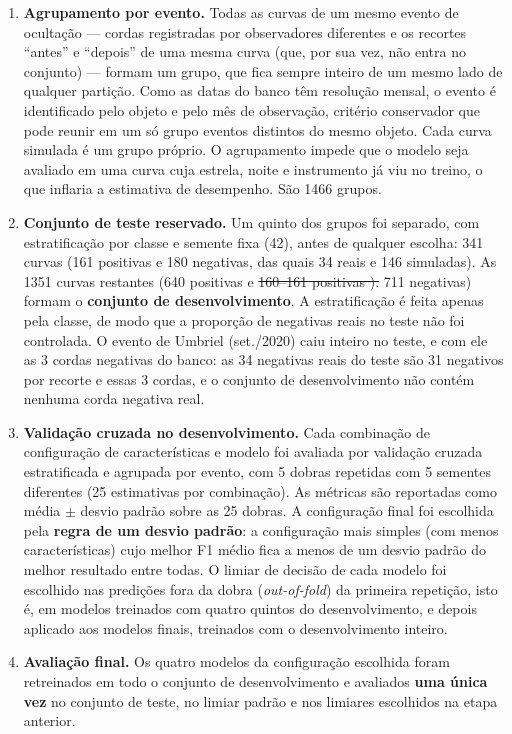 \documentclass[msc]{on} %
\makeatletter
\providecommand{\DIFaddtex}[1]{{\protect\color{red}#1}} %
\providecommand{\DIFdeltex}[1]{{\protect\color{red}\sout{#1}}} %
\providecommand{\DIFaddbegin}{} %
\providecommand{\DIFaddend}{} %
\providecommand{\DIFdelbegin}{} %
\providecommand{\DIFdelend}{} %
\providecommand{\DIFadd}[1]{\texorpdfstring{\DIFaddtex{#1}}{#1}} %
\providecommand{\DIFdel}[1]{\texorpdfstring{\DIFdeltex{#1}}{}} %
\let\sout@orig\sout %
\renewcommand{\sout}[1]{\ifmmode\text{\sout@orig{\ensuremath{#1}}}\else\sout@orig{#1}\fi} %
\makeatother
\begin{document}
\begin{enumerate}
	\item \textbf{\DIFadd{Agrupamento por evento.}} \DIFadd{Todas as curvas de um mesmo evento de ocultação --- cordas registradas por observadores diferentes e os recortes ``antes'' e ``depois'' de uma mesma curva (que, por sua vez, não entra no conjunto) --- formam um grupo, que fica sempre inteiro de um mesmo lado de qualquer partição. Como as datas do banco têm resolução mensal, o evento é identificado pelo objeto e pelo mês de observação, critério conservador que pode reunir em um só grupo eventos distintos do mesmo objeto. Cada curva simulada é um grupo próprio. O agrupamento impede que o modelo seja avaliado em uma curva cuja estrela, noite e instrumento já viu no treino, o que inflaria a estimativa de desempenho. São 1466 grupos.
	}\item \textbf{\DIFadd{Conjunto de teste reservado.}} \DIFadd{Um quinto dos grupos foi separado, com estratificação por classe e semente fixa (42), antes de qualquer escolha: 341 curvas (161 positivas e 180 negativas, das quais 34 reais e 146 simuladas). As 1351 curvas restantes (640 positivas }\DIFaddend e \DIFdelbegin \DIFdel{160--161 positivas ).
}\DIFdelend\ifhmode\hskip0pt\fi \DIFaddbegin \DIFadd{711 negativas) formam o }\textbf{\DIFadd{conjunto de desenvolvimento}}\DIFadd{. A estratificação é feita apenas pela classe, de modo que a proporção de negativas reais no teste não foi controlada. O evento de Umbriel (set./2020) caiu inteiro no teste, e com ele as 3 cordas negativas do banco: as 34 negativas reais do teste são 31 negativos por recorte e essas 3 cordas, e o conjunto de desenvolvimento não contém nenhuma corda negativa real.
	}\item \textbf{\DIFadd{Validação cruzada no desenvolvimento.}} \DIFadd{Cada combinação de configuração de características e modelo foi avaliada por validação cruzada estratificada e agrupada por evento, com 5 dobras repetidas com 5 sementes diferentes (25 estimativas por combinação). As métricas são reportadas como média $\pm$ desvio padrão sobre as 25 dobras. A configuração final foi escolhida pela }\textbf{\DIFadd{regra de um desvio padrão}}\DIFadd{: a configuração mais simples (com menos características) cujo melhor F1 médio fica a menos de um desvio padrão do melhor resultado entre todas. O limiar de decisão de cada modelo foi escolhido nas predições fora da dobra (}\textit{\DIFadd{out-of-fold}}\DIFadd{) da primeira repetição, isto é, em modelos treinados com quatro quintos do desenvolvimento, e depois aplicado aos modelos finais, treinados com o desenvolvimento inteiro.
	}\item \textbf{\DIFadd{Avaliação final.}} \DIFadd{Os quatro modelos da configuração escolhida foram retreinados em todo o conjunto de desenvolvimento e avaliados }\textbf{\DIFadd{uma única vez}} \DIFadd{no conjunto de teste, no limiar padrão e nos limiares escolhidos na etapa anterior.
}\end{enumerate}
\DIFaddend 
\end{document}
